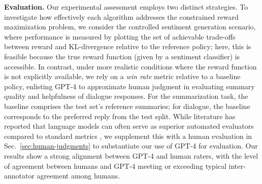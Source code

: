 \textbf{Evaluation.} Our experimental assessment employs two distinct strategies. To investigate how effectively each algorithm addresses the constrained reward maximization problem, we consider the controlled sentiment generation scenario, where performance is measured by plotting the set of achievable trade-offs between reward and KL-divergence relative to the reference policy; here, this is feasible because the true reward function (given by a sentiment classifier) is accessible. In contrast, under more realistic conditions where the reward function is not explicitly available, we rely on a \textit{win rate} metric relative to a baseline policy, enlisting GPT-4 to approximate human judgment in evaluating summary quality and helpfulness of dialogue responses. For the summarization task, the baseline comprises the test set’s reference summaries; for dialogue, the baseline corresponds to the preferred reply from the test split. While literature has reported that language models can often serve as superior automated evaluators compared to standard metrics \citep{Chen2023ExploringTU}, we supplement this with a human evaluation in Sec.~\ref{sec:human-judgments} to substantiate our use of GPT-4 for evaluation. Our results show a strong alignment between GPT-4 and human raters, with the level of agreement between humans and GPT-4 meeting or exceeding typical inter-annotator agreement among humans.

